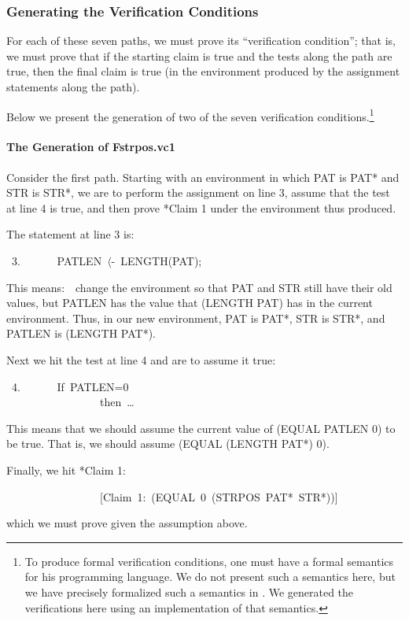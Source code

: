 \documentclass[10pt]{book}
\newenvironment{pubasis}{\begin{flushleft}}{\end{flushleft}}
\begin{document}
\subsubsection{Generating the Verification Conditions}
For each of these seven paths, we must prove its
``verification condition''; that is, we must prove that if the
starting claim is true and the tests along the path are
true, then the final claim is true (in the environment
produced by the assignment statements along the path). 

Below we present the generation of two of the seven verification
conditions.\footnote{To produce formal verification conditions, one must have a formal semantics for his programming language.  We do not present such a semantics here, but we have precisely formalized such a semantics in \cite{METHDOC}.  We generated the verifications here using an implementation of that semantics.}

\paragraph{The Generation of Fstrpos.vc1}
Consider the first path.  Starting with an environment in which PAT is PAT*
and STR is STR*, we are to perform the assignment on line 3, assume that the test
at line 4 is true, and then prove *Claim 1 under the environment thus produced.

The statement at line 3 is:
\begin{pubasis}
~3.	~~~~~~PATLEN~$\langle$-~LENGTH(PAT);\\
\end{pubasis}
This means:~~change the environment so that PAT and STR
still have their old values, but PATLEN has the value that (LENGTH PAT)
has in the current environment.  Thus, in our new environment, PAT is PAT*,
STR is STR*, and PATLEN is (LENGTH PAT*).

Next we hit the test at line 4 and are to assume it true:
\begin{pubasis}
~4.	~~~~~~If~PATLEN=0\\
~~~~~~~~~~~~~~~~~then~\ldots{}\\
\end{pubasis}
This means that we should assume the current value of
(EQUAL PATLEN 0) to be true.  That is, we should assume (EQUAL (LENGTH PAT*) 0).

Finally, we hit *Claim 1:
\begin{pubasis}
~~~~~~~~~~~~~~~~~{[}Claim~1:~(EQUAL~0~(STRPOS~PAT*~STR*)){]}\\
\end{pubasis}
which we must prove given the assumption above.
\end{document}
